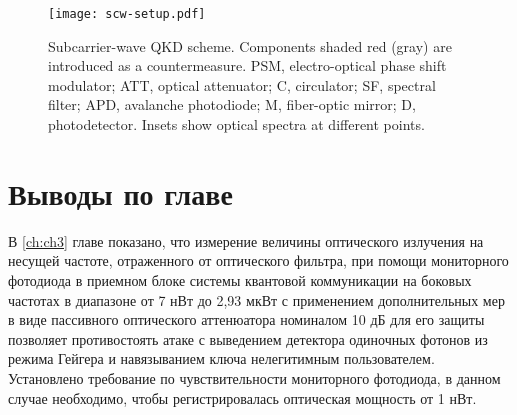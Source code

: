 \begin{figure}
	\centering \texttt{[image: scw-setup.pdf]}
	\caption{Subcarrier-wave QKD scheme. Components shaded red (gray) are introduced as a countermeasure. PSM, electro-optical phase shift modulator; ATT, optical attenuator; C, circulator; SF, spectral filter; APD,  avalanche photodiode;  M, fiber-optic mirror; D, photodetector. Insets show optical spectra at different points.}
	\label{fig:scw-setup}
\end{figure}

\pagebreak
\section{Выводы по главе} \label{ch:ch3/sec8}


В \ref{ch:ch3} главе показано, что измерение величины оптического излучения на несущей частоте, отраженного от оптического фильтра, при помощи мониторного фотодиода в приемном блоке системы квантовой коммуникации на боковых частотах в диапазоне от 7 нВт до 2,93 мкВт с применением дополнительных мер в виде пассивного оптического аттенюатора номиналом 10 дБ для его защиты позволяет противостоять атаке с выведением детектора одиночных фотонов из режима Гейгера и навязыванием ключа нелегитимным пользователем. Установлено требование по чувствительности мониторного фотодиода, в данном случае необходимо, чтобы регистрировалась оптическая мощность от 1 нВт.
  